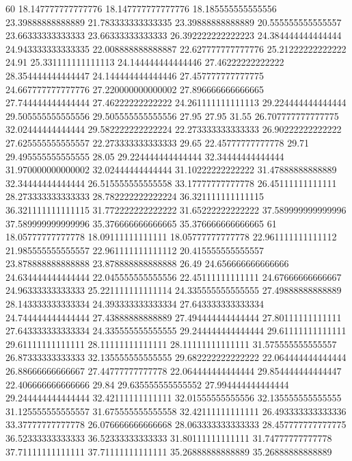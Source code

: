 60 18.147777777777776 18.147777777777776 18.185555555555556 23.39888888888889 21.783333333333335 23.39888888888889 20.555555555555557 23.66333333333333 23.66333333333333 26.392222222222223 24.384444444444444 24.943333333333335 22.008888888888887 22.627777777777776 25.21222222222222 24.91 25.331111111111113 24.144444444444446 27.46222222222222 28.354444444444447 24.144444444444446 27.457777777777775 24.667777777777776 27.220000000000002 27.896666666666665 27.744444444444444 27.46222222222222 24.261111111111113 29.224444444444444 29.505555555555556 29.505555555555556 27.95 27.95 31.55 26.707777777777775 32.02444444444444 29.582222222222224 22.273333333333333 26.90222222222222 27.625555555555557 22.273333333333333 29.65 22.45777777777778 29.71 29.495555555555555 28.05 29.224444444444444 32.34444444444444 31.970000000000002 32.02444444444444 31.10222222222222 31.47888888888889 32.34444444444444 26.515555555555558 33.17777777777778 26.45111111111111 28.273333333333333 28.782222222222224 36.321111111111115 36.321111111111115 31.772222222222222 31.65222222222222 37.589999999999996 37.589999999999996 35.376666666666665 35.376666666666665
61 18.05777777777778 18.09111111111111 18.05777777777778 22.961111111111112 21.985555555555557 22.961111111111112 20.415555555555557 23.878888888888888 23.878888888888888 26.49 24.656666666666666 24.634444444444444 22.045555555555556 22.45111111111111 24.67666666666667 24.96333333333333 25.221111111111114 24.335555555555555 27.49888888888889 28.143333333333334 24.393333333333334 27.643333333333334 24.744444444444444 27.43888888888889 27.494444444444444 27.80111111111111 27.643333333333334 24.335555555555555 29.244444444444444 29.61111111111111 29.61111111111111 28.11111111111111 28.11111111111111 31.575555555555557 26.87333333333333 32.135555555555555 29.682222222222222 22.064444444444444 26.88666666666667 27.44777777777778 22.064444444444444 29.854444444444447 22.406666666666666 29.84 29.635555555555552 27.994444444444444 29.244444444444444 32.42111111111111 32.01555555555556 32.135555555555555 31.125555555555557 31.675555555555558 32.42111111111111 26.493333333333336 33.37777777777778 26.076666666666668 28.063333333333333 28.457777777777775 36.52333333333333 36.52333333333333 31.80111111111111 31.74777777777778 37.71111111111111 37.71111111111111 35.26888888888889 35.26888888888889
